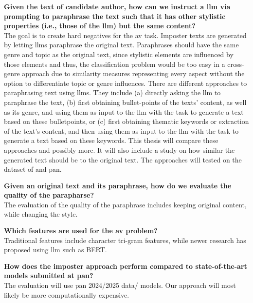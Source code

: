 \begin{questions}
    \item \textbf{Given the text of candidate author, how can we instruct a \ac{llm} via prompting to paraphrase the text such that it has other stylistic properties (i.e., those of the \ac{llm}) but the same content?} \label{enum:rq1} \hfill \\
    The goal is to create hard negatives for the \ac{av} task.
    Imposter texts are generated by letting \acp{llm} paraphrase the original text.
    Paraphrases should have the same genre and topic as the original text, 
    since stylistic elements are influenced by those elements and thus, 
    the classification problem would be too easy in a cross-genre approach 
    due to similarity measures representing every aspect without the option to differentiate topic or genre influences.
    There are different approaches to paraphrasing text using \acp{llm}.
    They include (a) directly asking the \ac{llm} to paraphrase the text, 
    (b) first obtaining bullet-points of the texts' content, as well as its genre, and using them as input to the \ac{llm} with the task to generate a text based on these bulletpoints, 
    or (c) first obtaining thematic keywords or extraction of the text's content, and then using them as input to the \ac{llm} with the task to generate a text based on these keywords.
    This thesis will compare these approaches and possibly more.
    It will also include a study on how similar the generated text should be to the original text.
    The approaches will tested on the dataset of \citet{koppel_determining_2014} and \ac{pan}.

    \item \textbf{Given an original text and its paraphrase, how do we evaluate the quality of the parapharse?} \label{enum:rq2} \hfill \\
    The evaluation of the quality of the paraphrase includes keeping original content, while changing the style.

    \item \textbf{Which features are used for the \ac{av} problem?} \label{enum:rq3} \hfill \\
    Traditional features include character tri-gram features, while newer research has proposed using \ac{llm} such as BERT.

    \item \textbf{How does the imposter approach perform compared to state-of-the-art models submitted at \ac{pan}?} \label{enum:rq4} \hfill \\
    The evaluation will use \ac{pan} 2024/2025 data/ models.
    Our approach will most likely be more computationally expensive.
\end{questions}


